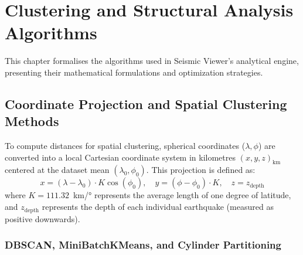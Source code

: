 
\chapter{Clustering and Structural Analysis Algorithms}
\label{ch:algorithms}

This chapter formalises the algorithms used in Seismic Viewer's analytical engine, presenting their mathematical formulations and optimization strategies.

\section{Coordinate Projection and Spatial Clustering Methods}
\label{sec:projection}
\label{sec:clustering-methods}

To compute distances for spatial clustering, spherical coordinates ($\lambda, \phi$) are converted into a local Cartesian coordinate system in kilometres $(x, y, z)_\text{km}$ centered at the dataset mean $(\lambda_0, \phi_0)$. This projection \cite{snyder1987map} is defined as:
\begin{equation}
    x = (\lambda - \lambda_0) \cdot K \cos(\phi_0), \quad
    y = (\phi - \phi_0) \cdot K, \quad
    z = z_\text{depth}
    \label{eq:projection}
\end{equation}
where $K = 111.32$~km/° represents the average length of one degree of latitude, and $z_\text{depth}$ represents the depth of each individual earthquake (measured as positive downwards).

\subsection{DBSCAN, MiniBatchKMeans, and Cylinder Partitioning}
\label{sec:dbscan-impl}
\label{sec:kmeans-impl}
\label{sec:cylinder-clustering}

